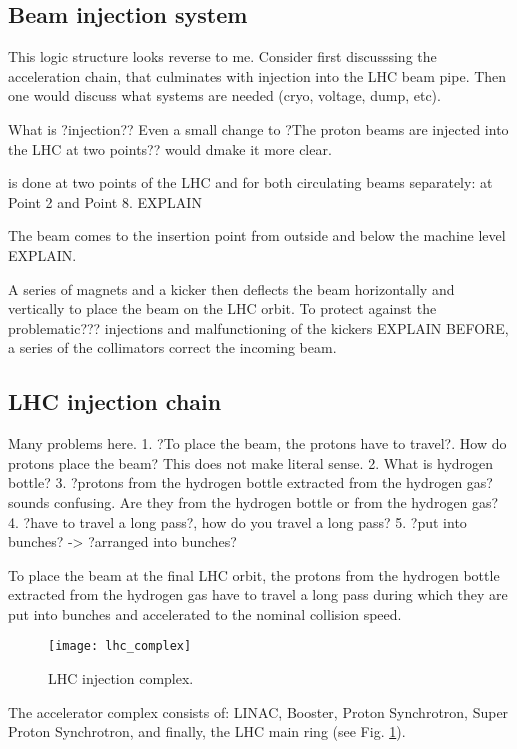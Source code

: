 \subsection{Beam injection system}\label{sec:injection}

This logic structure looks reverse to me. Consider first discusssing the acceleration chain, that culminates with injection into the LHC beam pipe. Then one would discuss what systems are needed (cryo, voltage, dump, etc). 


What is ?injection?? Even a small change to ?The proton beams are injected into the LHC at two points?? would dmake it more clear. 

 is done at two points of the LHC and for both circulating beams separately: at Point 2 and Point 8. EXPLAIN
 
 The beam comes to the insertion point from outside and below the machine level EXPLAIN. 
 
 A series of magnets and a kicker then deflects the beam horizontally and vertically to place the beam on the LHC orbit. To protect against the problematic??? injections and malfunctioning of the kickers EXPLAIN BEFORE, a series of the collimators correct the incoming beam. 

\subsection{LHC injection chain}\label{sec:injection_chain}

Many problems here.
1. ?To place the beam, the protons have to travel?.  How do protons place the beam? This does not make literal sense.
2. What is hydrogen bottle?
3. ?protons from the hydrogen bottle extracted from the hydrogen gas? sounds confusing. Are they from the hydrogen bottle or from the hydrogen gas?
4. ?have to travel a long pass?, how do you travel a long pass?
5. ?put into bunches? -> ?arranged into bunches? 


To place the beam at the final LHC orbit, the protons from the hydrogen bottle extracted from the hydrogen gas have to travel a long pass during which they are put into bunches and accelerated to the nominal collision speed. 

\begin{figure}[H]
  \centering
  \texttt{[image: lhc\_complex]}
  \caption{LHC injection complex.}\label{lhc_complex}
\end{figure}


The accelerator complex consists of: LINAC, Booster, Proton Synchrotron, Super Proton Synchrotron, and finally, the LHC main ring (see Fig. \ref{lhc_complex}). 

